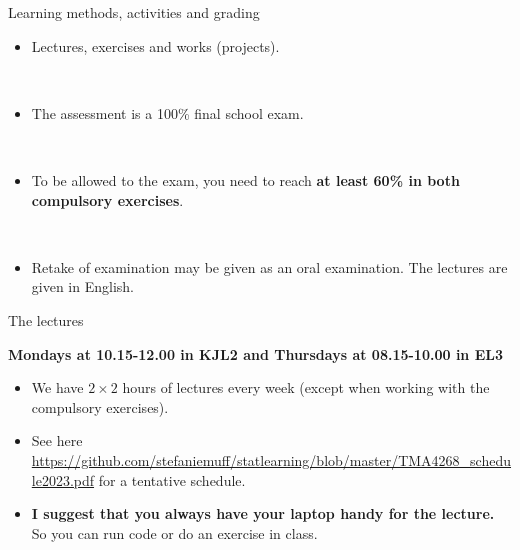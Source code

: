 \documentclass[
  10pt,
  ignorenonframetext,
]{beamer}
\providecommand{\tightlist}{%
  \setlength{\itemsep}{0pt}\setlength{\parskip}{0pt}}
\begin{document}
\begin{frame}
\begin{block}{Learning methods, activities and grading}
\protect\hypertarget{learning-methods-activities-and-grading}{}
\(~\)

\begin{itemize}
\tightlist
\item
  Lectures, exercises and works (projects).
\end{itemize}

\(~\)

\begin{itemize}
\tightlist
\item
  The assessment is a 100\% final school exam.
\end{itemize}

\(~\)

\begin{itemize}
\tightlist
\item
  To be allowed to the exam, you need to reach \textbf{at least 60\% in
  both compulsory exercises}.
\end{itemize}

\(~\)

\begin{itemize}
\tightlist
\item
  Retake of examination may be given as an oral examination. The
  lectures are given in English.
\end{itemize}
\end{block}
\end{frame}

\begin{frame}
\begin{block}{The lectures}
\protect\hypertarget{the-lectures}{}
\vspace{4mm}

\textbf{Mondays at 10.15-12.00 in KJL2 and Thursdays at 08.15-10.00 in
EL3}

\vspace{4mm}

\begin{itemize}
\tightlist
\item
  We have \(2\times 2\) hours of lectures every week (except when
  working with the compulsory exercises).
\end{itemize}

\vspace{2mm}

\begin{itemize}
\tightlist
\item
  See here
  \url{https://github.com/stefaniemuff/statlearning/blob/master/TMA4268_schedule2023.pdf}
  for a tentative schedule.
\end{itemize}

\vspace{2mm}

\begin{itemize}
\tightlist
\item
  \textbf{I suggest that you always have your laptop handy for the
  lecture.} So you can run code or do an exercise in class.
\end{itemize}
\end{block}
\end{frame}
\end{document}
